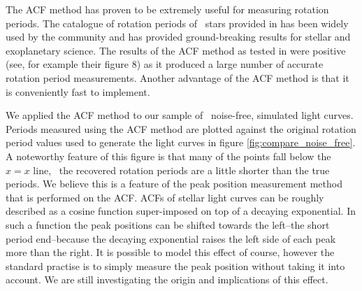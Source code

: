The ACF method has proven to be extremely useful for measuring rotation
periods.
The catalogue of rotation periods of \Kepler\ stars provided in
\citet{Mcquillan2013} has been widely used by the community and has provided
ground-breaking results for stellar and exoplanetary science.
The results of the ACF method as tested in \citet{Aigrain2015} were positive
(see, for example their figure 8) as it produced a large number of accurate
rotation period measurements.
Another advantage of the ACF method is that it is conveniently fast to
implement.

We applied the ACF method to our sample of \nlightcurves\ noise-free,
simulated light curves.
Periods measured using the ACF method are plotted against the original
rotation period values used to generate the light curves in figure
\ref{fig:compare_noise_free}.
A noteworthy feature of this figure is that many of the points fall below the
$x=x$ line, \ie\ the recovered rotation periods are a little shorter than the
true periods.
We believe this is a feature of the peak position measurement method that is
performed on the ACF.
ACFs of stellar light curves can be roughly described as a cosine function
super-imposed on top of a decaying exponential.
In such a function the peak positions can be shifted towards the left--the
short period end--because the decaying exponential raises the left side of
each peak more than the right.
It is possible to model this effect of course, however the standard practise
is to simply measure the peak position without taking it into account.
We are still investigating the origin and implications of this effect.


